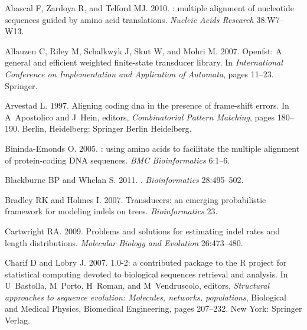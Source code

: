 \documentclass[12pt,letterpaper]{article}
\begin{document}
\clearpage
\newpage
%
\setlength{\bibhang}{0pt}
%
\begin{thebibliography}{43}
\providecommand{\natexlab}[1]{#1}

Abascal F, Zardoya R, and Telford MJ. 2010.
: multiple alignment of nucleotide sequences guided by
  amino acid translations.
\newblock \emph{Nucleic Acids Research} 38:W7--W13.

Allauzen C, Riley M, Schalkwyk J, Skut W, and Mohri M. 2007.
\newblock Openfst: A general and efficient weighted finite-state transducer
  library.
\newblock In \emph{International Conference on Implementation and Application
  of Automata}, pages 11--23. Springer.

Arvestad L. 1997.
\newblock Aligning coding dna in the presence of frame-shift errors.
\newblock In A~Apostolico and J~Hein, editors, \emph{Combinatorial Pattern
  Matching}, pages 180--190. Berlin, Heidelberg: Springer Berlin Heidelberg.

Bininda-Emonds O. 2005.
: using amino acids to facilitate the multiple alignment
  of protein-coding {DNA} sequences.
\newblock \emph{BMC Bioinformatics} 6:1--6.

Blackburne BP and Whelan S. 2011.
.
\newblock \emph{Bioinformatics} 28:495--502.

Bradley RK and Holmes I. 2007.
\newblock Transducers: an emerging probabilistic framework for modeling indels
  on trees.
\newblock \emph{Bioinformatics} 23.

Cartwright RA. 2009.
\newblock Problems and solutions for estimating indel rates and length
  distributions.
\newblock \emph{Molecular Biology and Evolution} 26:473--480.

Charif D and Lobry J. 2007.
 1.0-2: a contributed package to the {R} project for
  statistical computing devoted to biological sequences retrieval and analysis.
\newblock In U~Bastolla, M~Porto, H~Roman, and M~Vendruscolo, editors,
  \emph{Structural approaches to sequence evolution: Molecules, networks,
  populations}, Biological and Medical Physics, Biomedical Engineering, pages
  207--232. New York: Springer Verlag.


\end{thebibliography}
\end{document}
